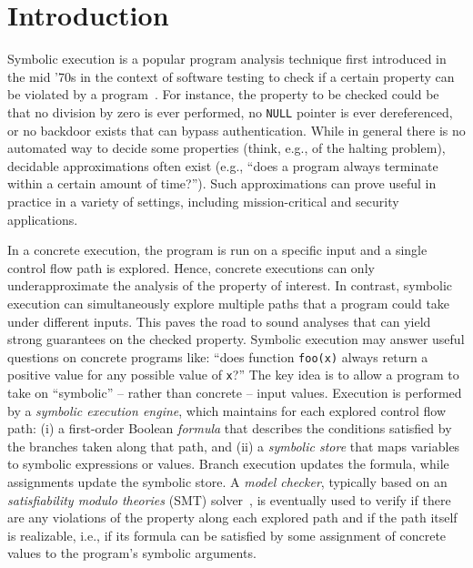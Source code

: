 
\section{Introduction}
\label{se:intro}

Symbolic execution is a popular program analysis technique first introduced in the mid '70s in the context of software testing to check if a certain property can be violated by a program~\cite{K-ICRS75,SELECT-ICRS75,K-CACM76,H-TSE77}. For instance, the property to be checked could be that no division by zero is ever performed, no {\tt NULL} pointer is ever dereferenced, or no backdoor exists that can bypass authentication. While in general there is no automated way to decide some properties (think, e.g., of the halting problem),  decidable approximations often exist (e.g., ``does a program always terminate within a certain amount of time?''). Such approximations can prove useful in practice in a variety of settings, including mission-critical and security applications.

In a concrete execution, the program is run on a specific input and a single control flow path is explored. Hence, concrete executions can only underapproximate the analysis of the property of interest. In contrast, symbolic execution can simultaneously explore multiple paths that a program could take under different inputs. This paves the road to sound analyses that can yield strong guarantees on the checked property. Symbolic execution may answer useful questions on concrete programs like: ``does function {\tt foo(x)} always return a positive value for any possible value of {\tt x}?'' The key idea is to allow a program to take on ``symbolic'' -- rather than concrete -- input values. Execution is performed by a {\em symbolic execution engine}, which maintains for each explored control flow path: (i) a first-order Boolean {\em formula} that describes the conditions satisfied by the branches taken along that path, and (ii) a {\em symbolic store} that maps variables to symbolic expressions or values. Branch execution updates the formula, while assignments update the symbolic store. A {\em model checker}, typically based on an {\em satisfiability modulo theories} (SMT) solver~\cite{HandbookOfSAT2009}, is eventually used to verify if there are any violations of the property along each explored path and if the path itself is realizable, i.e., if its formula can be satisfied by some assignment of concrete values to the program's symbolic arguments.


